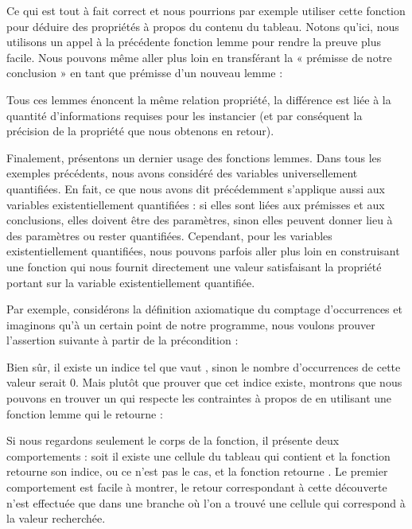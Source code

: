

Ce qui est tout à fait correct et nous pourrions par exemple utiliser cette fonction
pour déduire des propriétés à propos du contenu du tableau. Notons qu'ici, nous
utilisons un appel à la précédente fonction lemme pour rendre la preuve
plus facile. Nous pouvons même aller plus loin en transférant la « prémisse de
notre conclusion » en tant que prémisse d'un nouveau lemme :





Tous ces lemmes énoncent la même relation propriété, la différence est liée à la
quantité d'informations requises pour les instancier (et par conséquent la
précision de la propriété que nous obtenons en retour).


Finalement, présentons un dernier usage des fonctions lemmes. Dans tous les
exemples précédents, nous avons considéré des variables universellement quantifiées.
En fait, ce que nous avons dit précédemment s'applique aussi aux variables
existentiellement quantifiées : si elles sont liées aux prémisses et aux
conclusions, elles doivent être des paramètres, sinon elles peuvent donner lieu
à des paramètres ou rester quantifiées. Cependant, pour les variables
existentiellement quantifiées, nous pouvons parfois aller plus loin en construisant
une fonction qui nous fournit directement une valeur satisfaisant la propriété
portant sur la variable existentiellement quantifiée.



Par exemple, considérons la définition axiomatique du comptage d'occurrences et
imaginons qu'à un certain point de notre programme, nous voulons prouver
l'assertion suivante à partir de la précondition :




Bien sûr, il existe un indice  tel que  vaut
, sinon le nombre d'occurrences de cette valeur serait $0$.
Mais plutôt que prouver que cet indice existe, montrons que nous pouvons en
trouver un qui respecte les contraintes à propos de  en utilisant
une fonction lemme qui le retourne :




Si nous regardons seulement le corps de la fonction, il présente deux comportements :
soit il existe une cellule du tableau qui contient  et la fonction
retourne son indice, ou ce n'est pas le cas, et la fonction retourne
. Le premier comportement est facile à montrer, le retour
correspondant à cette découverte n'est effectuée que dans une branche où l'on a
trouvé une cellule qui correspond à la valeur recherchée.


